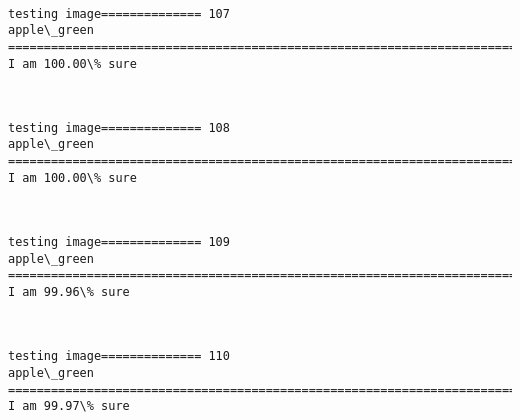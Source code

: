\documentclass[11pt]{article}
\begin{document}
    \begin{center}
    \end{center}
    { \hspace*{\fill} \\}
    
    \begin{Verbatim}[commandchars=\\\{\}]
testing image============== 107
apple\_green
============================================================================
I am 100.00\% sure

    \end{Verbatim}

    \begin{center}
    \end{center}
    { \hspace*{\fill} \\}
    
    \begin{Verbatim}[commandchars=\\\{\}]
testing image============== 108
apple\_green
============================================================================
I am 100.00\% sure

    \end{Verbatim}

    \begin{center}
    \end{center}
    { \hspace*{\fill} \\}
    
    \begin{Verbatim}[commandchars=\\\{\}]
testing image============== 109
apple\_green
============================================================================
I am 99.96\% sure

    \end{Verbatim}

    \begin{center}
    \end{center}
    { \hspace*{\fill} \\}
    
    \begin{Verbatim}[commandchars=\\\{\}]
testing image============== 110
apple\_green
============================================================================
I am 99.97\% sure

    \end{Verbatim}
\end{document}
